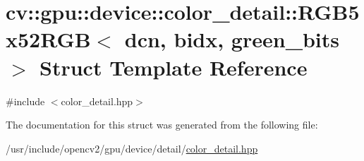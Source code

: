 \hypertarget{structcv_1_1gpu_1_1device_1_1color__detail_1_1RGB5x52RGB}{\section{cv\-:\-:gpu\-:\-:device\-:\-:color\-\_\-detail\-:\-:R\-G\-B5x52\-R\-G\-B$<$ dcn, bidx, green\-\_\-bits $>$ Struct Template Reference}
\label{structcv_1_1gpu_1_1device_1_1color__detail_1_1RGB5x52RGB}
}


{\ttfamily \#include $<$color\-\_\-detail.\-hpp$>$}



The documentation for this struct was generated from the following file\-:\begin{DoxyCompactItemize}
\item 
/usr/include/opencv2/gpu/device/detail/\hyperlink{color__detail_8hpp}{color\-\_\-detail.\-hpp}\end{DoxyCompactItemize}
